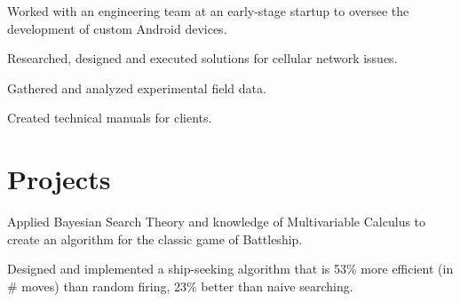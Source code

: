 \documentclass[]{deedy-resume-openfont}
\begin{document}
\begin{minipage}[t]{0.66\textwidth}
\begin{tightemize}
\item Worked with an engineering team at an early-stage startup to oversee the development of custom Android devices.
\item Researched, designed and executed solutions for cellular network issues.
\item Gathered and analyzed experimental field data.
\item Created technical manuals for clients.
\end{tightemize}
\sectionsep



%
%



\section{Projects}
\begin{tightemize}
\item Applied Bayesian Search Theory and knowledge of Multivariable Calculus to create an algorithm for the classic game of Battleship. 
\item Designed and implemented a ship-seeking algorithm that is 53\% more efficient (in \# moves) than random firing, 23\% better than naive searching.
\end{tightemize}


\end{minipage}
\end{document}
